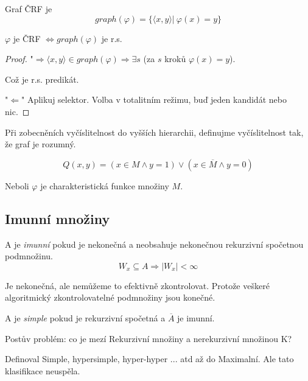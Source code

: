 \begin{definition}
	Graf ČRF je
	\[ graph(\varphi) = \{ \langle x, y \rangle |\ \varphi(x) = y \} \]
\end{definition}
\begin{consequence}
	$\varphi$ je ČRF $\iff graph(\varphi)$ je r.s.
\end{consequence}
\begin{proof}
	"$\Rightarrow \langle x, y \rangle \in graph(\varphi) \Rightarrow \exists s$ (za $s$ kroků $\varphi(x) = y$).

	Což je r.s. predikát.

	"$\Leftarrow$" Aplikuj selektor. Volba v totalitním režimu, buď jeden kandidát nebo nic.
\end{proof}

\begin{note}
	Při zobecněních vyčíslitelnost do vyšších hierarchii, definujme vyčíslitelnost tak, že graf je rozumný.
\end{note}

\begin{theorem}
	\[ Q(x,y) = (x \in M \land y = 1) \lor (x \in \overline{M} \land y = 0) \]

	Neboli $\varphi$ je charakteristická funkce množiny $M$.
\end{theorem}

\subsection{Imunní množiny}

\begin{definition}
	A je \emph{imunní} pokud je nekonečná a neobsahuje nekonečnou rekurzivní spočetnou podmnožinu.
	\[ W_x \subseteq A \Rightarrow |W_x| < \infty \]

	Je nekonečná, ale nemůžeme to efektivně zkontrolovat.
	Protože veškeré algoritmický zkontrolovatelné podmnožiny jsou konečné.
\end{definition}

\begin{definition}
	A je \emph{simple} pokud je rekurzivní spočetná a $\overline{A}$ je imunní.
\end{definition}

\begin{note}
	Postův problém: co je mezí Rekurzivní množiny a nerekurzivní množinou K?

	Definoval Simple, hypersimple, hyper-hyper ... atd až do Maximalní.
	Ale tato klasifikace neuspěla.
\end{note}

